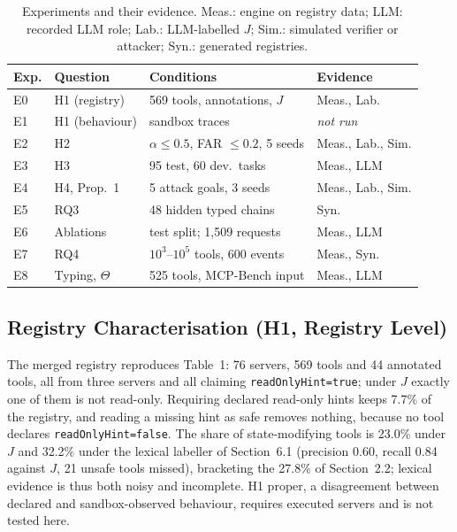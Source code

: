 \begin{table}[t]
\caption{Experiments and their evidence. Meas.: engine on registry data; LLM: recorded LLM role; Lab.:
LLM-labelled $J$; Sim.: simulated verifier or attacker; Syn.: generated registries.}
\label{tab:eval-design}
\centering\footnotesize\setlength{\tabcolsep}{3pt}
\begin{tabular}{@{}llp{3.5cm}l@{}}
\toprule
Exp. & Question & Conditions & Evidence\\
\midrule
E0 & H1 (registry) & 569 tools, annotations, $J$ & Meas., Lab.\\
E1 & H1 (behaviour) & sandbox traces & \emph{not run}\\
E2 & H2 & $\alpha\le0.5$, FAR $\le0.2$, 5 seeds & Meas., Lab., Sim.\\
E3 & H3 & 95 test, 60 dev.\ tasks & Meas., LLM\\
E4 & H4, Prop.~1 & 5 attack goals, 3 seeds & Meas., Lab., Sim.\\
E5 & RQ3 & 48 hidden typed chains & Syn.\\
E6 & Ablations & test split; 1,509 requests & Meas., LLM\\
E7 & RQ4 & $10^3$--$10^5$ tools, 600 events & Meas., Syn.\\
E8 & Typing, $\Theta$ & 525 tools, MCP-Bench input & Meas., LLM\\
\bottomrule
\end{tabular}
\end{table}

\subsection{Registry Characterisation (H1, Registry Level)}
\label{sec:eval-h1}

The merged registry reproduces Table~1: 76 servers, 569 tools and 44 annotated tools, all from three servers
and all claiming \texttt{readOnlyHint=true}; under $J$ exactly one of them is not read-only. Requiring declared
read-only hints keeps 7.7\% of the registry, and reading a missing hint as safe removes nothing, because no tool
declares \texttt{readOnlyHint=false}. The share of state-modifying tools is 23.0\% under $J$ and 32.2\% under
the lexical labeller of Section~6.1 (precision 0.60, recall 0.84 against $J$, 21 unsafe tools missed),
bracketing the 27.8\% of Section~2.2; lexical evidence is thus both noisy and incomplete. H1 proper, a disagreement between declared and sandbox-observed
behaviour, requires executed servers and is not tested here.

